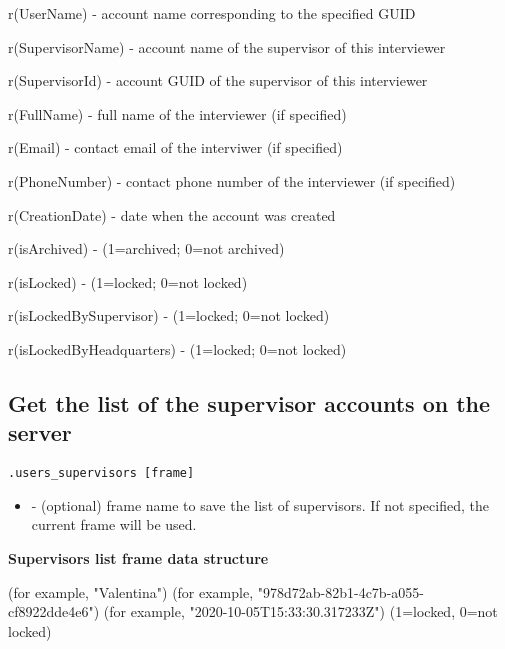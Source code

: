 \savedres
\begin{compactitem}
    \item r(UserName) - account name corresponding to the specified GUID
    \item r(SupervisorName) - account name of the supervisor of this interviewer
    \item r(SupervisorId) - account GUID of the supervisor of this interviewer
    \item r(FullName) - full name of the interviewer (if specified)
    \item r(Email) - contact email of the interviwer (if specified)
    \item r(PhoneNumber) - contact phone number of the interviewer (if specified)
    \item r(CreationDate) - date when the account was created
    \item r(isArchived) - (1=archived; 0=not archived)
    \item r(isLocked) - (1=locked; 0=not locked)
    \item r(isLockedBySupervisor) - (1=locked; 0=not locked)
    \item r(isLockedByHeadquarters) - (1=locked; 0=not locked)
\end{compactitem}

\subsection{Get the list of the supervisor accounts on the server}
\begin{lstlisting}[style=CommandLineStyle]
.users_supervisors [frame]
\end{lstlisting}

\paramsheader
\begin{itemize}
\item {} - (optional) frame name to save the list of supervisors. If not specified, the current frame will be used.
\end{itemize}
\textbf{Supervisors list frame data structure}

\begin{compactitem}
     (for example, "Valentina")
     (for example, "978d72ab-82b1-4c7b-a055-cf8922dde4e6")
     (for example, "2020-10-05T15:33:30.317233Z")
     (1=locked, 0=not locked)
\end{compactitem}

